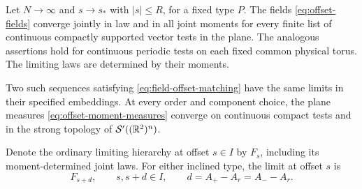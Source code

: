 \begin{proposition}
\label{prop:offset-limits}
Let $N\to\infty$ and $s\to s_*$ with $|s|\le R$, for a fixed type
$P$.  The fields \eqref{eq:offset-fields} converge jointly in law and
in all joint moments for every finite list of continuous compactly
supported vector tests in the plane.  The analogous assertions hold
for continuous periodic tests on each fixed common physical torus.
The limiting laws are determined by their moments.

Two such sequences satisfying \eqref{eq:field-offset-matching} have
the same limits in their specified embeddings.  At every order and
component choice, the plane measures
\eqref{eq:offset-moment-measures} converge on continuous compact tests
and in the strong topology of $\mathcal S'((\mathbb R^2)^n)$.

Denote the ordinary limiting hierarchy at offset $s\in I$ by $F_s$,
including its moment-determined joint laws.  For either inclined type,
the limit at offset $s$ is
\begin{equation}
 F_{s+d},\qquad s,s+d\in I,\qquad d=A_+-A_r=A_--A_r.
 \label{eq:inclined-offset-limit}
\end{equation}
\end{proposition}

